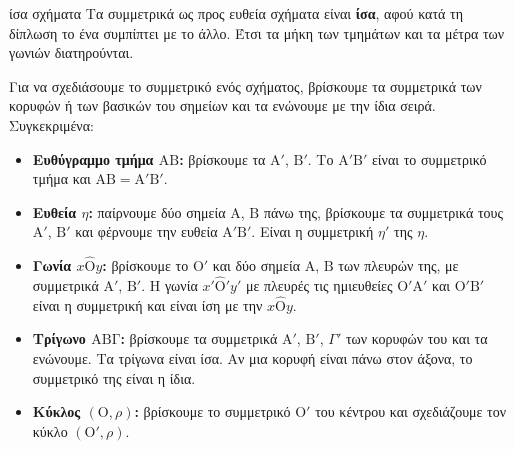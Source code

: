 \begin{idiotita}{ίσα σχήματα}
Τα συμμετρικά ως προς ευθεία σχήματα είναι \textbf{ίσα}, αφού κατά τη δίπλωση το ένα συμπίπτει με το άλλο. Έτσι τα μήκη των τμημάτων και τα μέτρα των γωνιών διατηρούνται.
\end{idiotita}

Για να σχεδιάσουμε το συμμετρικό ενός σχήματος, βρίσκουμε τα συμμετρικά των κορυφών ή των βασικών του σημείων και τα ενώνουμε με την ίδια σειρά. Συγκεκριμένα:
\begin{itemize}[leftmargin=1.2em,itemsep=0.3ex,topsep=2pt]
\item \textbf{Ευθύγραμμο τμήμα $\mathrm{ΑΒ}$:} βρίσκουμε τα $\mathrm{Α}'$, $\mathrm{Β}'$. Το $\mathrm{Α}'\mathrm{Β}'$ είναι το συμμετρικό τμήμα και $\mathrm{ΑΒ}=\mathrm{Α}'\mathrm{Β}'$.
\item \textbf{Ευθεία $\eta$:} παίρνουμε δύο σημεία $\mathrm{Α}$, $\mathrm{Β}$ πάνω της, βρίσκουμε τα συμμετρικά τους $\mathrm{Α}'$, $\mathrm{Β}'$ και φέρνουμε την ευθεία $\mathrm{Α}'\mathrm{Β}'$. Είναι η συμμετρική $\eta'$ της $\eta$.
\item \textbf{Γωνία $x\hat{\mathrm{Ο}}y$:} βρίσκουμε το $\mathrm{Ο}'$ και δύο σημεία $\mathrm{Α}$, $\mathrm{Β}$ των πλευρών της, με συμμετρικά $\mathrm{Α}'$, $\mathrm{Β}'$. Η γωνία $x'\hat{\mathrm{Ο}}'y'$ με πλευρές τις ημιευθείες $\mathrm{Ο}'\mathrm{Α}'$ και $\mathrm{Ο}'\mathrm{Β}'$ είναι η συμμετρική και είναι ίση με την $x\hat{\mathrm{Ο}}y$.
\item \textbf{Τρίγωνο $\mathrm{ΑΒΓ}$:} βρίσκουμε τα συμμετρικά $\mathrm{Α}'$, $\mathrm{Β}'$, $\Gamma'$ των κορυφών του και τα ενώνουμε. Τα τρίγωνα είναι ίσα. Αν μια κορυφή είναι πάνω στον άξονα, το συμμετρικό της είναι η ίδια.
\item \textbf{Κύκλος $(\mathrm{Ο},\rho)$:} βρίσκουμε το συμμετρικό $\mathrm{Ο}'$ του κέντρου και σχεδιάζουμε τον κύκλο $(\mathrm{Ο}',\rho)$.
\end{itemize}

\begin{center}
\end{center}

